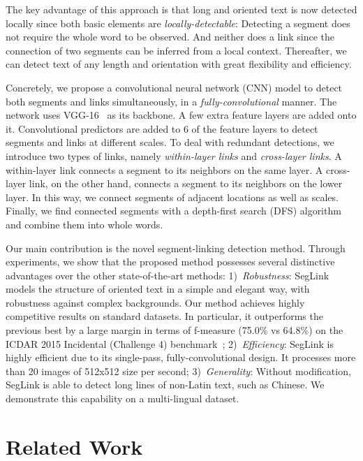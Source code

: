 \documentclass[10pt,twocolumn,letterpaper]{article}
\begin{document}
The key advantage of this approach is that long and oriented text is now detected locally since both basic elements are \emph{locally-detectable}: Detecting a segment does not require the whole word to be observed. And neither does a link since the connection of two segments can be inferred from a local context.
Thereafter, we can detect text of any length and orientation with great flexibility and efficiency.

Concretely, we propose a convolutional neural network (CNN) model to detect both segments and links simultaneously, in a \emph{fully-convolutional} manner.
The network uses VGG-16~\cite{corr/SimonyanZ14a} as its backbone. A few extra feature layers are added onto it.
Convolutional predictors are added to 6 of the feature layers to detect segments and links at different scales.
To deal with redundant detections, we introduce two types of links, namely \emph{within-layer links} and \emph{cross-layer links}.
A within-layer link connects a segment to its neighbors on the same layer.
A cross-layer link, on the other hand, connects a segment to its neighbors on the lower layer.
In this way, we connect segments of adjacent locations as well as scales.
Finally, we find connected segments with a depth-first search (DFS) algorithm and combine them into whole words.

Our main contribution is the novel segment-linking detection method. Through experiments, we show that the proposed method possesses several distinctive advantages over the other state-of-the-art methods: 1)~\emph{Robustness}: SegLink models the structure of oriented text in a simple and elegant way, with robustness against complex backgrounds. Our method achieves highly competitive results on standard datasets. In particular, it outperforms the previous best by a large margin in terms of f-measure (75.0\% vs 64.8\%) on the ICDAR 2015 Incidental (Challenge 4) benchmark~\cite{icdar/KaratzasGNGBIMN15}; 2)~\textit{Efficiency}: SegLink is highly efficient due to its single-pass, fully-convolutional design. It processes more than 20 images of 512x512 size per second; 3)~\textit{Generality}: Without modification, SegLink is able to detect long lines of non-Latin text, such as Chinese. We demonstrate this capability on a multi-lingual dataset.


\section{Related Work}
\end{document}
